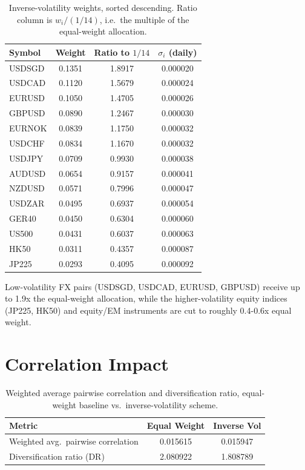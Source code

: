 \documentclass[11pt]{article}
\begin{document}
\begin{table}[h]
\centering
\caption{Inverse-volatility weights, sorted descending. Ratio column is
\(w_i / (1/14)\), i.e.\ the multiple of the equal-weight allocation.}
\begin{tabular}{lS[table-format=1.4]S[table-format=1.4]S[table-format=1.6]}
\toprule
Symbol & {Weight} & {Ratio to $1/14$} & {$\sigma_i$ (daily)} \\
\midrule
USDSGD & 0.1351 & 1.8917 & 0.000020 \\
USDCAD & 0.1120 & 1.5679 & 0.000024 \\
EURUSD & 0.1050 & 1.4705 & 0.000026 \\
GBPUSD & 0.0890 & 1.2467 & 0.000030 \\
EURNOK & 0.0839 & 1.1750 & 0.000032 \\
USDCHF & 0.0834 & 1.1670 & 0.000032 \\
USDJPY & 0.0709 & 0.9930 & 0.000038 \\
AUDUSD & 0.0654 & 0.9157 & 0.000041 \\
NZDUSD & 0.0571 & 0.7996 & 0.000047 \\
USDZAR & 0.0495 & 0.6937 & 0.000054 \\
GER40  & 0.0450 & 0.6304 & 0.000060 \\
US500  & 0.0431 & 0.6037 & 0.000063 \\
HK50   & 0.0311 & 0.4357 & 0.000087 \\
JP225  & 0.0293 & 0.4095 & 0.000092 \\
\bottomrule
\end{tabular}
\end{table}

Low-volatility FX pairs (USDSGD, USDCAD, EURUSD, GBPUSD) receive up to 1.9x the
equal-weight allocation, while the higher-volatility equity indices (JP225, HK50)
and equity/EM instruments are cut to roughly 0.4-0.6x equal weight.

\section{Correlation Impact}

\begin{table}[h]
\centering
\caption{Weighted average pairwise correlation and diversification ratio,
equal-weight baseline vs.\ inverse-volatility scheme.}
\begin{tabular}{lS[table-format=1.6]S[table-format=1.6]}
\toprule
Metric & {Equal Weight} & {Inverse Vol} \\
\midrule
Weighted avg.\ pairwise correlation & 0.015615 & 0.015947 \\
Diversification ratio (DR)          & 2.080922 & 1.808789 \\
\bottomrule
\end{tabular}
\end{table}
\end{document}
